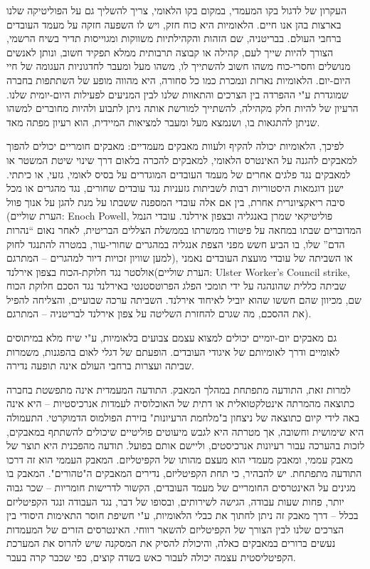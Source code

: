 העקרון של לדגול בקו המעמדי, במקום בקו הלאומי, צריך להשליך גם על הפוליטיקה שלנו בארצות בהן אנו חיים. הלאומיות היא כוח חזק, ויש לו השפעה חזקה על מעמד העובדים ברחבי העולם. בבריטניה, שם הזהות והקהילתיות משווקות ומגוייסות תדיר בשיח הרשמי, הצורך להיות שייך לעם, קהילה או קבוצה תרבותית ממלא תפקיד חשוב, ונותן לאנשים מנושלים וחסרי-כוח משהו חשוב להשתייך לו, משהו מעל ומעבר לחדגוניות העגומה של חיי היום-יום. הלאומיות נארזת ונמכרת כמו כל סחורה, היא מהווה מופע של השתתפות בחברה שמוגדרת ע"י ההפרדה בין הצרכים והתאוות שלנו לבין המניעים לפעילות היום-יומית שלנו. הרעיון של להיות חלק מקהילה, להשתייך למורשת אותה ניתן לתבוע ולהיות מחוברים למשהו שניתן להתגאות בו, ושנמצא מעל ומעבר למציאות המיידית, הוא רעיון מפתה מאד.

לפיכך, הלאומיות יכולה להקיף ולעוות מאבקים מעמדיים: מאבקים חומריים יכולים להפוך למאבקים להגנה על האינטרס הלאומי, למאבקים להכרה בלאום דרך שינוי שיטת המשטר או למאבקים נגד פלגים אחרים של מעמד העובדים המוגדרים על בסיס לאומי, גזעי, או כיתתי. ישנן דוגמאות היסטוריות רבות לשביתות גזעניות נגד עובדים שחורים, נגד מהגרים או מכל סיבה ריאקציונרית אחרת, בין אם אלה עובדי המספנה ששבתו על מנת להגן על אנוך פוול (הערת שוליים: Enoch Powell, פוליטיקאי שמרן באנגליה ובצפון אירלנד. עובדי הנמל המדוברים שבתו במחאה על פיטורו ממשרתו בממשלת הצללים הבריטית, לאחר נאום “נהרות הדם” שלו, בו הביע חשש מפני הצפת אנגליה במהגרים שחורי-עור, במטרה להתנגד לחוק למען שוויון זכויות דיור למהגרים – המתרגם), או השביתה של עובדי מועצת העובדים נאמני אולסטר נגד חלוקת-הכוח בצפון אירלנד(הערת שוליים: Ulster Worker's Council strike, שביתה כללית שהונהגה על ידי תומכי הפלג הפרוטסטנטי באירלנד נגד הסכם חלוקת הכוח שם, מכיוון שהם חששו שהוא יוביל לאיחוד אירלנד. השביתה ערכה שבועיים, והצליחה להפיל את ההסכם, מה שגרם להחזרת השליטה על צפון אירלנד לבריטניה – המתרגם).

גם מאבקים יום-יומיים יכולים למצוא עצמם צבועים בלאומיות, ע"י שיח מלא במיתוסים לאומיים ודרך לאומיותם של איגודי העובדים. הופעתם של דגלי לאום בהפגנות, משמרות שביתה ועצרות ברחבי העולם אינה תופעה נדירה.

למרות זאת, התודעה מתפתחת במהלך המאבק. התודעה המעמדית אינה מתפשטת בחברה כתוצאה מהמרתה אינטלקטואלית או דתית של האוכלוסיה לעמדות אנרכיסטיות – היא אינה באה לידי קיום כתוצאה של ניצחון ב"מלחמת הרעיונות" בזירת הפולמוס הדמוקרטי. התעמולה היא שימושית וחשובה, אך מטרתה היא לגבש מיעוטים פוליטיים שיכולים להשתתף במאבקים, לזכות בהערכה עבור רעיונות אנרכיסטים, וליישם אותם בפועל. תודעה מהפכנית היא תוצר של מאבק עממי, ומאבק מעמדי הוא מעצם מהותו של הקפיטליזם. המאבק העממי הוא זה דרכו התודעה מתפתחת. יש להבהיר, כי תחת הקפיטליזם, נדירים המאבקים ה"טהורים". המאבק בו מגינים על האינטרסים החומריים של מעמד העובדים, הקשור לדרישות חומריות – שכר גבוה יותר, פחות שעות עבודה, הגישה לשירותים, ובסופו של דבר, נגד העבודה ונגד הקפיטליזם בכלל – דרך מאבק זה ניתן לחתוך את כבלי הלאומיות, ע"י חשיפת חוסר התאימות היסודי בין הצרכים שלנו לבין הצורך של הקפיטליזם להשאר רווחי. האינטרסים הזרים של המעמדות נעשים ברורים במאבקים כאלה, והיכולת להסיק את המסקנה שיש להרוס את המערכת הקפיטליסטית עצמה יכולה לעבור כאש בשדה קוצים, כפי שכבר קרה בעבר.

